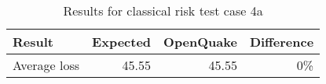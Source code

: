\begin{table}[htbp]

\centering
\begin{tabular}{ l r r r }

\hline
\rowcolor{anti-flashwhite}
\bf{Result} & \bf{Expected} & \bf{OpenQuake} & \bf{Difference}\\
\hline
Average loss & 45.55 & 45.55 & 0\% \\
\hline
\end{tabular}

\caption{Results for classical risk test case 4a}
\label{tab:result-classical-risk-4a}
\end{table}